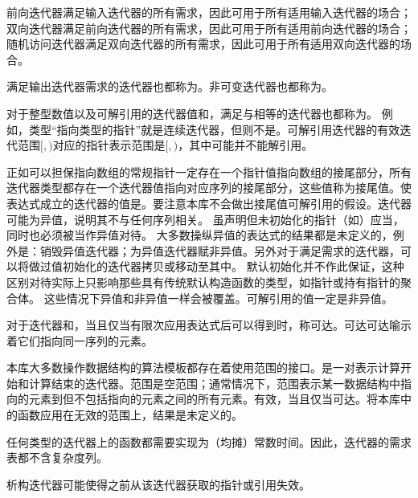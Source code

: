 \pnum
前向迭代器满足输入迭代器的所有需求，因此可用于所有适用输入迭代器的场合；双向迭代器满足前向迭代器的所有需求，因此可用于所有适用前向迭代器的场合；随机访问迭代器满足双向迭代器的所有需求，因此可用于所有适用双向迭代器的场合。

\pnum
满足输出迭代器需求的迭代器也都称为。非可变迭代器也都称为。

\pnum
对于整型数值以及可解引用的迭代器值和，满足与相等的迭代器也都称为。
\enternote
例如，类型“指向类型的指针”就是连续迭代器，但则不是。可解引用迭代器的有效迭代范围$[$$, $$)$对应的指针表示范围是$[$$, $$)$，其中可能并不能解引用。
\exitnote

\pnum
正如可以担保指向数组的常规指针一定存在一个指针值指向数组的接尾部分，所有迭代器类型都存在一个迭代器值指向对应序列的接尾部分，这些值称为{接尾}值。使表达式成立的迭代器的值是。要注意本库不会做出接尾值可解引用的假设。迭代器可能为异值，说明其不与任何序列相关。
\enterexample
虽声明但未初始化的指针（如）应当，同时也必须被当作异值对待。
\exitexample
大多数操纵异值的表达式的结果都是未定义的，例外是：销毁异值迭代器；为异值迭代器赋非异值。另外对于满足需求的迭代器，可以将做过值初始化的迭代器拷贝或移动至其中。
\enternote
默认初始化并不作此保证，这种区别对待实际上只影响那些具有传统默认构造函数的类型，如指针或持有指针的聚合体。
\exitnote
这些情况下异值和非异值一样会被覆盖。可解引用的值一定是非异值。

\pnum
对于迭代器和，当且仅当有限次应用表达式后可以得到时，称可达。可达可达喻示着它们指向同一序列的元素。

\pnum
本库大多数操作数据结构的算法模板都存在着使用范围的接口。是一对表示计算开始和计算结束的迭代器。范围是空范围；通常情况下，范围表示某一数据结构中指向的元素到但不包括指向的元素之间的所有元素。有效，当且仅当可达。将本库中的函数应用在无效的范围上，结果是未定义的。

\pnum
任何类型的迭代器上的函数都需要实现为（均摊）常数时间。因此，迭代器的需求表都不含复杂度列。

\pnum
析构迭代器可能使得之前从该迭代器获取的指针或引用失效。

